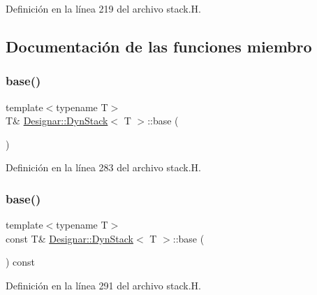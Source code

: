 Definición en la línea 219 del archivo stack.\+H.



\subsection{Documentación de las funciones miembro}
\mbox{\label{class_designar_1_1_dyn_stack_aa07528cd0ef77519ca5b5694bed9695d}} 
\subsubsection{\texorpdfstring{base()}{base()}\hspace{0.1cm}{\footnotesize\ttfamily [1/2]}}
{\footnotesize\ttfamily template$<$typename T$>$ \\
T\& \hyperlink{class_designar_1_1_dyn_stack}{Designar\+::\+Dyn\+Stack}$<$ T $>$\+::base (\begin{DoxyParamCaption}{ }\end{DoxyParamCaption})\hspace{0.3cm}{\ttfamily [inline]}}



Definición en la línea 283 del archivo stack.\+H.

\mbox{\label{class_designar_1_1_dyn_stack_affe0e56802ac0c982f598e2155bf4a46}} 
\subsubsection{\texorpdfstring{base()}{base()}\hspace{0.1cm}{\footnotesize\ttfamily [2/2]}}
{\footnotesize\ttfamily template$<$typename T$>$ \\
const T\& \hyperlink{class_designar_1_1_dyn_stack}{Designar\+::\+Dyn\+Stack}$<$ T $>$\+::base (\begin{DoxyParamCaption}{ }\end{DoxyParamCaption}) const\hspace{0.3cm}{\ttfamily [inline]}}



Definición en la línea 291 del archivo stack.\+H.

